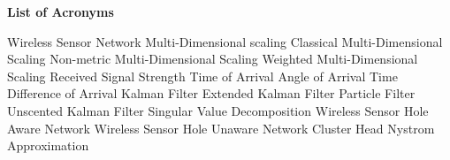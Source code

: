 \label{page:Acronyms}
\begin{center}
\textbf{\Large List of Acronyms}
\end{center}
\begin{acronym}
 Wireless Sensor Network\vspace*{0.5mm}
  {Multi-Dimensional scaling}
 {Classical Multi-Dimensional Scaling}
 {Non-metric Multi-Dimensional Scaling}
 {Weighted Multi-Dimensional Scaling}
 {Received Signal Strength}
 {Time of Arrival}
 {Angle of Arrival}
 {Time Difference of Arrival}
 {Kalman Filter}
 {Extended Kalman Filter}
 {Particle Filter}
 {Unscented Kalman Filter}
 {Singular Value Decomposition}
 {Wireless Sensor Hole Aware Network}
 {Wireless Sensor Hole Unaware Network}
 {Cluster Head}
 {Nystrom Approximation}
\end{acronym}